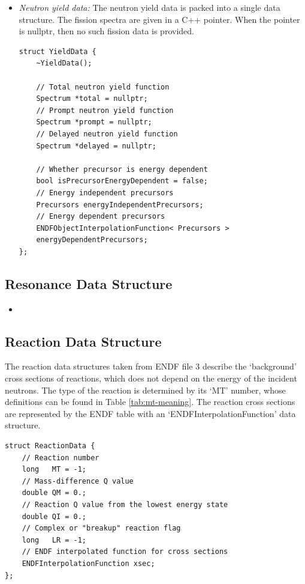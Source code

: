 \begin{itemize}
\item{\em Neutron yield data: }
The neutron yield data is packed into a single data structure. The fission spectra are given in a C++ pointer. When the pointer is nullptr, then no such fission data is provided.
\begin{verbatim}
struct YieldData {
    ~YieldData();
    
    // Total neutron yield function
    Spectrum *total = nullptr;
    // Prompt neutron yield function
    Spectrum *prompt = nullptr;
    // Delayed neutron yield function
    Spectrum *delayed = nullptr;
    
    // Whether precursor is energy dependent
    bool isPrecursorEnergyDependent = false;
    // Energy independent precursors
    Precursors energyIndependentPrecursors;
    // Energy dependent precursors
    ENDFObjectInterpolationFunction< Precursors >
    energyDependentPrecursors;
};
\end{verbatim}

\end{itemize}

\subsection{Resonance Data Structure}

\begin{itemize}
\item
\end{itemize}

\subsection{Reaction Data Structure}
The reaction data structures taken from ENDF file 3 describe the `background' cross sections of reactions, which does not depend on the energy of the incident neutrons. The type of the reaction is determined by its `MT' number, whose definitions can be found in Table \ref{tab:mt-meaning}. The reaction cross sections are represented by the ENDF table with an `ENDFInterpolationFunction' data structure.
\begin{verbatim}
struct ReactionData {
    // Reaction number
    long   MT = -1;
    // Mass-difference Q value
    double QM = 0.;
    // Reaction Q value from the lowest energy state
    double QI = 0.;
    // Complex or "breakup" reaction flag
    long   LR = -1;
    // ENDF interpolated function for cross sections
    ENDFInterpolationFunction xsec;
};
\end{verbatim}

